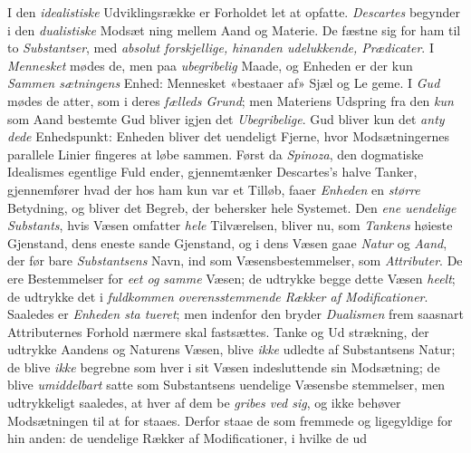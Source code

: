 I den \emph{idealistiske} Udviklingsrække er Forholdet let at
opfatte. \emph{Descartes} begynder i den \emph{dualistiske} Modsæt\-%
ning mellem Aand og Materie. De fæstne sig for ham til to
\emph{Substantser}, med \emph{absolut forskjellige, hinanden
udelukkende, Prædicater}. I \emph{Mennesket} mødes de, men
paa \emph{ubegribelig} Maade, og Enheden er der kun \emph{Sammen\-%
sætningens} Enhed: Mennesket «bestaaer af» Sjæl og Le\-%
geme. I \emph{Gud} mødes de atter, som i deres \emph{fælleds Grund};
men Materiens Udspring fra den \emph{kun} som Aand bestemte Gud
bliver igjen det \emph{Ubegribelige}. Gud bliver kun det \emph{anty\-%
dede} Enhedspunkt: Enheden bliver det uendeligt Fjerne, hvor
Modsætningernes parallele Linier fingeres at løbe sammen.
Først da \emph{Spinoza}, den dogmatiske Idealismes egentlige Fuld\-%
ender, gjennemtænker Descartes's halve Tanker, gjennemfører
hvad der hos ham kun var et Tilløb, faaer \emph{Enheden} en
\emph{større} Betydning, og bliver det Begreb, der behersker hele
Systemet. Den \emph{ene uendelige Substants}, hvis Væsen
omfatter \emph{hele} Tilværelsen, bliver nu, som \emph{Tankens} høieste
Gjenstand, dens eneste sande Gjenstand, og i dens Væsen gaae
\emph{Natur} og \emph{Aand}, der før bare \emph{Substantsens} Navn, ind som
Væsensbestemmelser, som \emph{Attributer}. De ere Bestemmelser
for \emph{eet og samme} Væsen; de udtrykke begge dette Væsen
\emph{heelt}; de udtrykke det i \emph{fuldkommen overensstemmende
Rækker af Modificationer}. Saaledes er \emph{Enheden sta\-%
tueret}; men indenfor den bryder \emph{Dualismen} frem saasnart
Attributernes Forhold nærmere skal fastsættes. Tanke og Ud\-%
strækning, der udtrykke Aandens og Naturens Væsen, blive
\emph{ikke} udledte af Substantsens Natur; de blive \emph{ikke} begrebne
som hver i sit Væsen indesluttende sin Modsætning; de blive
\emph{umiddelbart} satte som Substantsens uendelige Væsensbe\-%
stemmelser, men udtrykkeligt saaledes, at hver af dem be\-%
\emph{gribes ved sig}, og ikke behøver Modsætningen til at for\-%
staaes. Derfor staae de som fremmede og ligegyldige for hin\-%
anden: de uendelige Rækker af Modificationer, i hvilke de ud\-%

